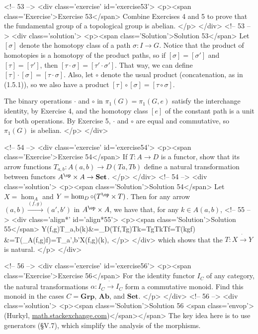 <!-- 53 -->
<div class='exercise' id='exercise53'>
<p><span class='Exercise'>Exercise 53</span>
Combine Exercises 4 and 5 to prove that the fundamental group of a topological group is abelian.
</p>
</div>
<!-- 53 -->
<div class='solution'>
<p><span class='Solution'>Solution 53</span>
Let $[\sigma]$ denote the homotopy class of a path $\sigma:I\to G$. Notice that the product of homotopies is a homotopy of the product paths, so if $[\sigma]=[\sigma']$ and $[\tau]=[\tau']$, then $[\tau\cdot\sigma]=[\tau'\cdot\sigma']$. That way, we can define $[\tau]\cdot[\sigma]=[\tau\cdot\sigma]$. Also, let $\circ$ denote the usual product (concatenation, as in (1.5.1)), so we also have a product $[\tau]\circ[\sigma]=[\tau\circ\sigma]$.

The binary operations $\cdot$ and $\circ$ in $\pi_1(G)=\pi_1(G,e)$ satisfy the interchange identity, by Exercise 4, and the homotopy class $[e]$ of the constant path is a unit for both operations. By Exercise 5, $\cdot$ and $\circ$ are equal and commutative, so $\pi_1(G)$ is abelian.
</p>
</div>

<!-- 54 -->
<div class='exercise' id='exercise54'>
<p><span class='Exercise'>Exercise 54</span>
If $T:A\to D$ is a functor, show that its arrow functions $T_{a,b}:A(a,b)\to D(Ta,Tb)$ define a natural transformation between functors $A^{\op}\times A\to \mathbf{Set}$.
</p>
</div>
<!-- 54 -->
<div class='solution'>
<p><span class='Solution'>Solution 54</span>
Let $X=\hom_A$ and $Y=\hom_D \circ (T^{\op}\times T)$. Then for any arrow $(a,b)\overset{(f,g)}{\to}(a',b')$ in $A^{\op}\times A$, we have that, for any $k\in A(a,b)$,
<!-- 55 -->
<div class='align*' id='align*55'>
<p><span class='Solution'>Solution 55</span>
Y(f,g)\circ T_{a,b}(k)&=\hom_D(Tf,Tg)\circ Tk=Tg\circ Tk\circ Tf=T(kgf)\\
&=T(\hom_A(f,g)f)=T_{a',b'}\circ X(f,g)(k),
</p>
</div>
which shows that the $T:X\dot{\to}Y$ is natural.
</p>
</div>

<!-- 56 -->
<div class='exercise' id='exercise56'>
<p><span class='Exercise'>Exercise 56</span>
For the identity functor $I_C$ of any category, the natural transformations $\alpha:I_C\dot{\to} I_C$ form a commutative monoid. Find this monoid in the cases $C=\mathbf{Grp}$, $\mathbf{Ab}$, and $\mathbf{Set}$.
</p>
</div>
<!-- 56 -->
<div class='solution'>
<p><span class='Solution'>Solution 56 <span class='envop'>(Hurkyl, \href{http://math.stackexchange.com/questions/818624/center-of-the-categories-mathbfgrp-and-mathbfab}{math.stackexchange.com})</span></span>
The key idea here is to use generators (\S V.7), which simplify the analysis of the morphisms.

